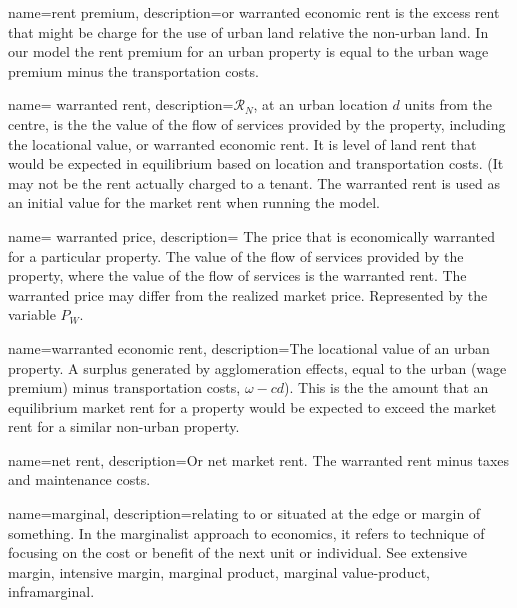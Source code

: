 {
name=rent premium,
description={or \gls{warranted economic rent} is the excess rent  that might be charge for the use of urban land relative the non-urban land. In our model the rent premium for an urban property is equal to the urban wage premium minus the transportation costs. }
}

{
name= warranted rent,
description={$\mathcal{R}_N$, at an  urban location  $d$ units from the centre, is the the value of the flow of services provided by the property, including the locational value, or \gls{warranted economic rent}. It is level of land rent that would be expected in equilibrium based on location and transportation costs.  (It may not be the rent actually charged to a tenant. The warranted rent is used as an initial value  for the market rent when running the model. }
}

{
name= warranted price,
description={%
The price that is economically warranted for a particular property. The  value of the flow of services provided by the property, where the value of the flow of services is the \gls{warranted rent}. %
The warranted price may differ from the realized \gls{market price}. Represented by the variable $P_W$. }
}

{
name=warranted economic rent,
description={The locational value of an urban property. A surplus generated by \glspl{agglomeration effect}, equal to the urban (wage premium) minus transportation costs, $\omega-{c} d$). This is the the amount that an equilibrium market rent for a property would be expected to exceed the market rent for a similar non-urban property.}
}

{
name=net rent,
description={Or net market rent. The \gls{warranted rent} minus taxes and maintenance costs.}
}



{
name=marginal,
description={relating to or situated at the edge or margin of something. In the marginalist approach to economics, it  refers to technique of focusing on the cost or benefit of the next unit or individual. See \gls{extensive margin}, \gls{intensive margin}, \gls{marginal product}, \gls{marginal value-product}, \gls{inframarginal}.}
}


